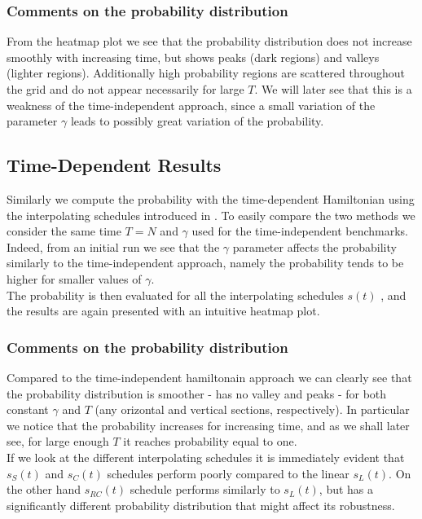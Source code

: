         \subsubsection*{Comments on the probability distribution}
        From the heatmap plot we see that the probability distribution does not increase smoothly with increasing time, but shows peaks (dark regions) and valleys (lighter regions). Additionally high probability regions are scattered throughout the grid and do not appear necessarily for large $T$. We will later see that this is a weakness of the time-independent approach, since a small variation of the parameter $\gamma$ leads to possibly great variation of the probability.

    \subsection{Time-Dependent Results}\label{subsec:time_dependent_results}
        Similarly we compute the probability with the time-dependent Hamiltonian using the interpolating schedules introduced in . To easily compare the two methods we consider the same time $T=N$ and $\gamma$ used for the time-independent benchmarks. Indeed, from an initial run we see that the $\gamma$ parameter affects the probability similarly to the time-independent approach, namely the probability tends to be higher for smaller values of $\gamma$.\\
        The probability is then evaluated for all the interpolating schedules $s(t)$ , and the results are again presented with an intuitive heatmap plot.

        \clearpage
        \subsubsection*{Comments on the probability distribution}
        Compared to the time-independent hamiltonain approach we can clearly see that the probability distribution is smoother - has no valley and peaks - for both constant $\gamma$ and $T$ (any orizontal and vertical sections, respectively). In particular we notice that the probability increases for increasing time, and as we shall later see, for large enough $T$ it reaches probability equal to one.\\ If we look at the different interpolating schedules it is immediately evident that $s_S(t)$ and $s_C(t)$ schedules perform poorly compared to the linear $s_L(t)$. On the other hand $s_{RC}(t)$ schedule performs similarly to $s_L(t)$, but has a significantly different probability distribution  that might affect its robustness.

